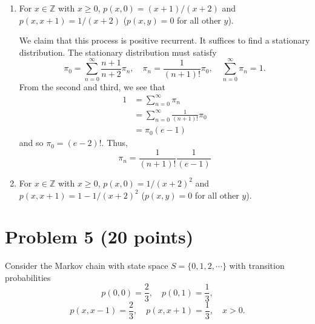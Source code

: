 \documentclass[11pt]{article}
\begin{document}
\begin{enumerate}[label=(\alph*)]
    \item For \(x\in\mathbb{Z}\) with \(x\geq 0\), \(p(x,0)=(x+1)/(x+2)\) and \(p(x,x+1)=1/(x+2)\) (\(p(x,y)=0\) for all other \(y\)).
\begin{solution}
We claim that this process is positive recurrent. It suffices to find a stationary distribution. The stationary distribution must satisfy
\[\pi_0 = \sum_{n=0}^\infty \frac{n+1}{n+2}\pi_n, \quad \pi_n = \frac{1}{(n+1)!}\pi_0, \quad \sum_{n=0}^\infty \pi_n = 1.\] From the second and third, we see that 
\begin{align*}
    1 &= \sum_{n=0}^\infty \pi_n\\
    &= \sum_{n=0}^\infty \frac{1}{(n+1)!}\pi_0\\
    &= \pi_0(e-1)
\end{align*}
and so $\pi_0 = (e-2)!.$ Thus, 
\[\pi_n = \frac{1}{(n+1)!}\frac{1}{(e-1)}\]
\end{solution}
    
    \item For \(x\in\mathbb{Z}\) with \(x\geq 0\), \(p(x,0)=1/(x+2)^{2}\) and \(p(x,x+1)=1-1/(x+2)^{2}\) (\(p(x,y)=0\) for all other \(y\)).
\end{enumerate}

\section*{Problem 5 (20 points)}
Consider the Markov chain with state space \(S=\{0,1,2,\cdots\}\) with transition probabilities
\[
p(0,0)=\frac{2}{3},\quad p(0,1)=\frac{1}{3},
\]
\[
p(x,x-1)=\frac{2}{3},\quad p(x,x+1)=\frac{1}{3},\quad x>0.
\]
\end{document}
